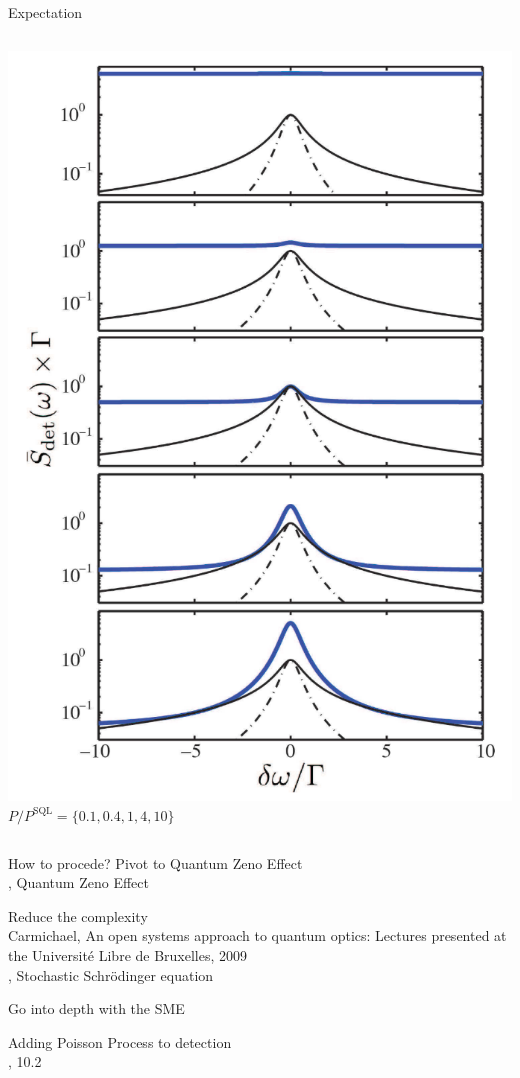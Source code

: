 \documentclass{beamer}
\begin{document}
\begin{frame}{Expectation}
\begin{columns}
		\small\centering
		\includegraphics[width=\textwidth]{figures/3.5.png}
		$P/P^\text{SQL} = \{0.1, 0.4, 1, 4, 10\}$
	\end{columns}
\end{frame}

\begin{frame}{How to procede?}
	Pivot to Quantum Zeno Effect\\
	{\tiny\cite{kramer_quantumopticsjl_2024}, Quantum Zeno Effect}

	Reduce the complexity\\
	{\tiny Carmichael, An open systems approach to quantum optics: Lectures presented at the Université Libre de Bruxelles, 2009\\
	\cite{kramer_quantumopticsjl_2024}, Stochastic Schrödinger equation}

	\textcolor{seegrau}{Go into depth with the SME}
	
	\textcolor{seegrau}{
		Adding Poisson Process to detection\\
		{\tiny\cite{jacobs_straightforward_2006}, 10.2}
	}
\end{frame}


{
	\begin{frame}[plain]{}\end{frame}
}
\end{document}
